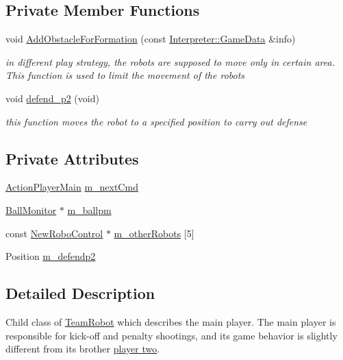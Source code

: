 \subsection*{Private Member Functions}
\begin{DoxyCompactItemize}
\item 
void \hyperlink{classPlayerMain_a978b3ce16f5d8e5d1cb9ef70f387227e}{AddObstacleForFormation} (const \hyperlink{structInterpreter_1_1GameData}{Interpreter::GameData} \&info)
\begin{DoxyCompactList}\small\item\em in different play strategy, the robots are supposed to move only in certain area. This function is used to limit the movement of the robots \item\end{DoxyCompactList}\item 
void \hyperlink{classPlayerMain_a64e1d5734e07cfa82b2571aa11bb4f9d}{defend\_\-p2} (void)
\begin{DoxyCompactList}\small\item\em this function moves the robot to a specified position to carry out defense \item\end{DoxyCompactList}\end{DoxyCompactItemize}
\subsection*{Private Attributes}
\begin{DoxyCompactItemize}
\item 
\hyperlink{classPlayerMain_af07f952a547b2902a452c1413f26dae2}{ActionPlayerMain} \hyperlink{classPlayerMain_a038f8616ec79dd26bae8039b6ada8321}{m\_\-nextCmd}
\item 
\hyperlink{classBallMonitor}{BallMonitor} $\ast$ \hyperlink{classPlayerMain_aea071084f1a844ceafac3621ffb5c320}{m\_\-ballpm}
\item 
const \hyperlink{classNewRoboControl}{NewRoboControl} $\ast$ \hyperlink{classPlayerMain_a020813a869e52dc7368ba9216b10e3d8}{m\_\-otherRobots} \mbox{[}5\mbox{]}
\item 
Position \hyperlink{classPlayerMain_a859b462c123135acc3ad88b092429611}{m\_\-defendp2}
\end{DoxyCompactItemize}


\subsection{Detailed Description}
Child class of \hyperlink{classTeamRobot}{TeamRobot} which describes the main player. The main player is responsible for kick-\/off and penalty shootings, and its game behavior is slightly different from its brother \hyperlink{classPlayerTwo}{player two}. 

